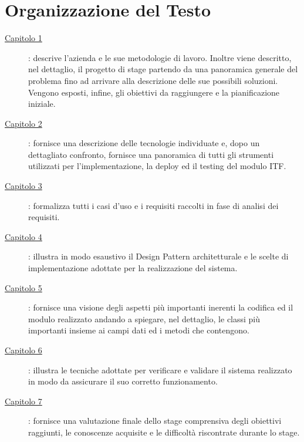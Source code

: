 
\cleardoublepage
{}
{}
\begingroup
\let\clearpage\relax
\let\cleardoublepage\relax
\let\cleardoublepage\relax

\chapter*{Organizzazione del Testo}

\begin{description}
	\item[{\hyperref[cap:introduzione]{Capitolo 1}}]: descrive l'azienda e le sue metodologie di lavoro. Inoltre viene descritto, nel dettaglio, il progetto di stage partendo da una panoramica generale del problema fino ad arrivare alla descrizione delle sue possibili soluzioni. Vengono esposti, infine, gli obiettivi da raggiungere e la pianificazione iniziale.
	
	\item[{\hyperref[cap:tecnologie_e_strumenti]{Capitolo 2}}]: fornisce una descrizione delle tecnologie individuate e, dopo un dettagliato confronto, fornisce una panoramica di tutti gli strumenti utilizzati per l'implementazione, la deploy ed il testing del modulo ITF. 
	
	\item[{\hyperref[cap:analisi_dei_requisiti]{Capitolo 3}}]: formalizza tutti i casi d'uso e i requisiti raccolti in fase di analisi dei requisiti.
	
	\item[{\hyperref[cap:progettazione]{Capitolo 4}}]: illustra in modo esaustivo il Design Pattern architetturale e le scelte di implementazione adottate per la realizzazione del sistema.
	
	\item[{\hyperref[cap:codifica]{Capitolo 5}}]: fornisce una visione degli aspetti più importanti inerenti la codifica ed il modulo realizzato andando a spiegare, nel dettaglio, le classi più importanti insieme ai campi dati ed i metodi che contengono.
	
	\item[{\hyperref[cap:verifica_validazione]{Capitolo 6}}]: illustra le tecniche adottate per verificare e validare il sistema realizzato in modo da assicurare il suo corretto funzionamento.
	
	\item[{\hyperref[cap:valutazione_finale]{Capitolo 7}}]: fornisce una valutazione finale dello stage comprensiva degli obiettivi raggiunti, le conoscenze acquisite e le difficoltà riscontrate durante lo stage.
	
\end{description}


